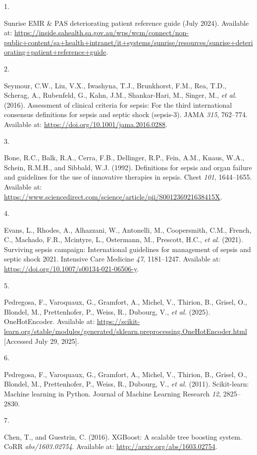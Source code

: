 \documentclass[
  a4paper,
  ,captions=tableheading
]{scrartcl}
\newlength{\cslhangindent}
\newlength{\csllabelwidth}
\newenvironment{CSLReferences}[2] %
 {\begin{list}{}{%
  \setlength{\itemindent}{0pt}
  \setlength{\leftmargin}{0pt}
  \setlength{\parsep}{0pt}
  \ifodd #1
   \setlength{\leftmargin}{\cslhangindent}
   \setlength{\itemindent}{-1\cslhangindent}
  \fi
  \setlength{\itemsep}{#2\baselineskip}}}
 {\end{list}}
\newcommand{\CSLLeftMargin}[1]{\parbox[t]{\csllabelwidth}{\strut#1\strut}}
\newcommand{\CSLRightInline}[1]{\parbox[t]{\linewidth - \csllabelwidth}{\strut#1\strut}}
\begin{document}
\protect{}\label{refs}
\begin{CSLReferences}{0}{1}
\CSLLeftMargin{1. }%
\CSLRightInline{Sunrise EMR \& PAS deteriorating patient reference guide
(July 2024). Available at:
\url{https://inside.sahealth.sa.gov.au/wps/wcm/connect/non-public+content/sa+health+intranet/it+systems/sunrise/resources/sunrise+deteriorating+patient+reference+guide}.}

\CSLLeftMargin{2. }%
\CSLRightInline{Seymour, C.W., Liu, V.X., Iwashyna, T.J., Brunkhorst,
F.M., Rea, T.D., Scherag, A., Rubenfeld, G., Kahn, J.M., Shankar-Hari,
M., Singer, M., \emph{et al.} (2016). Assessment of clinical criteria
for sepsis: For the third international consensus definitions for sepsis
and septic shock (sepsis-3). JAMA \emph{315}, 762--774. Available at:
\url{https://doi.org/10.1001/jama.2016.0288}.}

\CSLLeftMargin{3. }%
\CSLRightInline{Bone, R.C., Balk, R.A., Cerra, F.B., Dellinger, R.P.,
Fein, A.M., Knaus, W.A., Schein, R.M.H., and Sibbald, W.J. (1992).
Definitions for sepsis and organ failure and guidelines for the use of
innovative therapies in sepsis. Chest \emph{101}, 1644--1655. Available
at:
\url{https://www.sciencedirect.com/science/article/pii/S001236921638415X}.}

\CSLLeftMargin{4. }%
\CSLRightInline{Evans, L., Rhodes, A., Alhazzani, W., Antonelli, M.,
Coopersmith, C.M., French, C., Machado, F.R., Mcintyre, L., Ostermann,
M., Prescott, H.C., \emph{et al.} (2021). Surviving sepsis campaign:
International guidelines for management of sepsis and septic shock 2021.
Intensive Care Medicine \emph{47}, 1181--1247. Available at:
\url{https://doi.org/10.1007/s00134-021-06506-y}.}

\CSLLeftMargin{5. }%
\CSLRightInline{Pedregosa, F., Varoquaux, G., Gramfort, A., Michel, V.,
Thirion, B., Grisel, O., Blondel, M., Prettenhofer, P., Weiss, R.,
Dubourg, V., \emph{et al.} (2025). OneHotEncoder. Available at:
\url{https://scikit-learn.org/stable/modules/generated/sklearn.preprocessing.OneHotEncoder.html}
{[}Accessed July 29, 2025{]}.}

\CSLLeftMargin{6. }%
\CSLRightInline{Pedregosa, F., Varoquaux, G., Gramfort, A., Michel, V.,
Thirion, B., Grisel, O., Blondel, M., Prettenhofer, P., Weiss, R.,
Dubourg, V., \emph{et al.} (2011). Scikit-learn: Machine learning in
{P}ython. Journal of Machine Learning Research \emph{12}, 2825--2830.}

\CSLLeftMargin{7. }%
\CSLRightInline{Chen, T., and Guestrin, C. (2016). XGBoost: {A} scalable
tree boosting system. CoRR \emph{abs/1603.02754}. Available at:
\url{http://arxiv.org/abs/1603.02754}.}

\end{CSLReferences}
\end{document}
